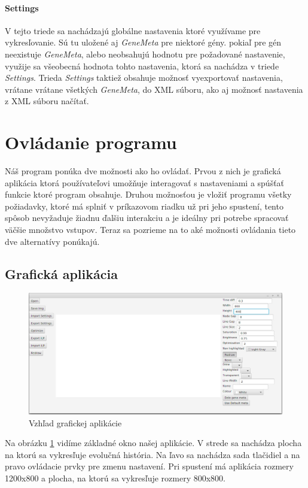\paragraph{Settings} V tejto triede sa nachádzajú globálne nastavenia ktoré využívame
pre vykresľovanie. Sú tu uložené aj \emph{GeneMeta} pre niektoré gény.
pokiaľ pre gén neexistuje \emph{GeneMeta}, alebo neobsahujú hodnotu pre požadované nastavenie, 
využije sa všeobecná hodnota tohto nastavenia, ktorá sa nachádza v triede \emph{Settings}.
Trieda \emph{Settings} taktiež obsahuje možnosť vyexportovať nastavenia, vrátane vrátane všetkých 
\emph{GeneMeta}, do XML súboru, ako aj možnosť nastavenia z XML súboru načítať.

\section{Ovládanie programu}
Náš program ponúka dve možnosti ako ho ovládať. Prvou z nich je grafická aplikácia ktorá používateľovi 
umožňuje interagovať s nastaveniami a 
spúšťať funkcie ktoré program obsahuje.
Druhou možnosťou je vložiť programu všetky požiadavky, ktoré má splniť v príkazovom riadku
už pri jeho spustení, tento spôsob nevyžaduje žiadnu ďalšiu interakciu a je ideálny pri potrebe
spracovať väčšie množstvo vstupov.
Teraz sa pozrieme na to aké možnosti ovládania tieto dve alternatívy ponúkajú.
\subsection{Grafická aplikácia}
\begin{figure}[t]
 \centering
\includegraphics[width=1\textwidth]{images/gui}
\caption{Vzhľad grafickej aplikácie}\label{obr:gui}
\end{figure}

Na obrázku \ref{obr:gui} vidíme základné okno našej aplikácie. V strede sa nachádza plocha na ktorú sa 
vykresľuje evolučná história. Na ľavo sa nachádza sada tlačidiel a na pravo ovládacie prvky pre zmenu nastavení.
Pri spustení má aplikácia rozmery 1200x800 a plocha, na ktorú sa vykresľuje rozmery 800x800.
